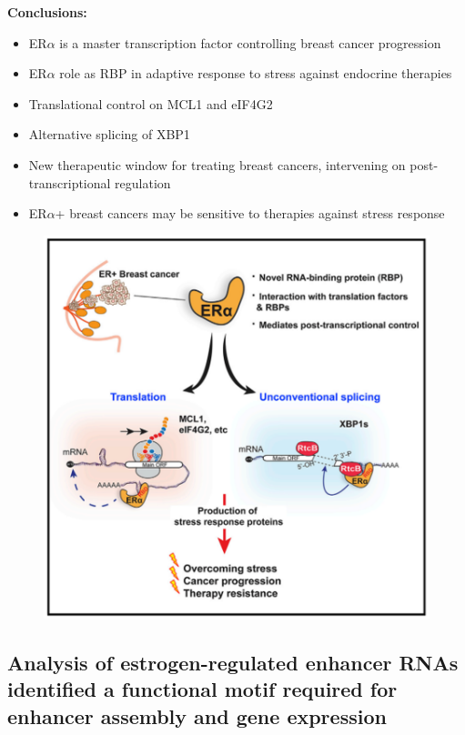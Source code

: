 \textbf{Conclusions:}
\begin{itemize}
\item ER$\alpha$ is a master transcription factor controlling breast cancer progression
\item ER$\alpha$ role as RBP in adaptive response to stress against endocrine therapies 
\item Translational control on MCL1 and eIF4G2
\item Alternative splicing of XBP1
\item New therapeutic window for treating breast cancers, intervening on post-transcriptional regulation
\item ER$\alpha$+ breast cancers may be sensitive to therapies against stress response 
\end{itemize}

\begin{figure}
\centering
\includegraphics[width=\textwidth]{../_resources/era.png}
\caption{}
\end{figure}

\subsection{Analysis of estrogen-regulated enhancer RNAs identified a functional motif required for enhancer assembly and gene expression}


